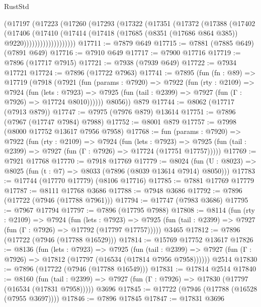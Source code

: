 \begin{lexlean}{RustStd}
\begin{coremodule}
              (@17197
                (@17223
                  (@17260
                    (@17293
                      (@17322
                        (@17351
                          (@17372
                            (@17388
                              (@17402
                                (@17406
                                  (@17410
                                    (@17414
                                      (@17418
                                        (@17685 (@8351 (@17686 @864 @385)) @9220)))))))))))))))))))
@17711 := @7879 @649
@17715 := @7881 (@7885 @649) (@7891 @649)
@17716 := @7910 @649
@17717 := @7900 @17716
@17719 := @7896 (@17717 @7915)
@17721 := @7938 (@7939 @649)
@17722 := @7934 @17721
@17724 := @7896 (@17722 @7963)
@17741 := @7895
    (fun (fn : @89) =>
    @17719
      (@7918
        (@7921
          (fun (params : @7920) =>
          @7922
            (fun (rty : @2109) =>
            @7924
              (fun (lets : @7923) =>
              @7925 (fun (tail : @2399) => @7927 (fun (Γ : @7926) => @17724 @8010))))))
        @8056))
    @879
@17744 := @8062 (@17717 (@7913 @879))
@17747 := @7975 (@7976 @879) @13614
@17751 := @7896 (@7967 (@17747 @7984) @7988)
@17752 := @8001 @879
@17757 := @7998 (@8000 @17752 @13617 @7956 @7958)
@17768 := fun (params : @7920) =>
  @7922
    (fun (rty : @2109) =>
    @7924
      (fun (lets : @7923) =>
      @7925 (fun (tail : @2399) => @7927 (fun (Γ : @7926) => @17724 (@17751 @17757)))))
@17769 := @7921 @17768
@17770 := @7918 @17769
@17779 := @8024
    (fun (U : @8023) => @8025 (fun (t : @7) => @8033 (@7896 (@8039 @13614 @7914) @8050)))
@17783 := @17744 (@17770 @17779) (@8106 @17716)
@17785 := @7881 @17769 @17779
@17787 := @8111 @17768 @3686
@17788 := @7948 @3686
@17792 := @7896 (@17722 (@7946 (@17788 @7961)))
@17794 := @17747 (@7983 @3686)
@17795 := @7967 @17794
@17797 := @7896 (@17795 @7988)
@17808 := @8114
    (fun (rty : @2109) =>
    @7924
      (fun (lets : @7923) =>
      @7925 (fun (tail : @2399) => @7927 (fun (Γ : @7926) => @17792 (@17797 @17757)))))
    @3465
@17812 := @7896 (@17722 (@7946 (@17788 @16529)))
@17814 := @15769 @17752 @13617
@17826 := @8136
    (fun (lets : @7923) =>
    @7925
      (fun (tail : @2399) =>
      @7927 (fun (Γ : @7926) => @17812 (@17797 (@16534 (@17814 @7956 @7958))))))
    @2514
@17830 := @7896 (@17722 (@7946 (@17788 @16549)))
@17831 := @17814 @2514
@17840 := @8160
    (fun (tail : @2399) => @7927 (fun (Γ : @7926) => @17830 (@17797 (@16534 (@17831 @7958)))))
    @3696
@17845 := @17722 (@7946 (@17788 (@16528 (@7955 @3697))))
@17846 := @7896 @17845
@17847 := @17831 @3696

\end{coremodule}
\end{lexlean}
